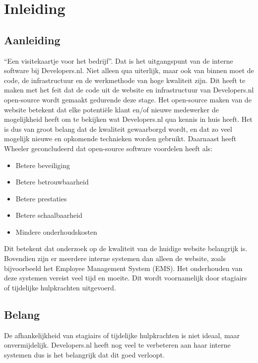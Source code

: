 \chapter{Inleiding}

\label{Chapter1}


\section{Aanleiding}

\enquote{Een visitekaartje voor het bedrijf}. Dat is het uitgangspunt van de interne software bij Developers.nl. Niet alleen qua uiterlijk, maar ook van binnen moet de code, de infrastructuur en de werkmethode van hoge kwaliteit zijn. Dit heeft te maken met het feit dat de code uit de website en infrastructuur van Developers.nl open-source wordt gemaakt gedurende deze stage. Het open-source maken van de website betekent dat elke potentiële klant en/of nieuwe medewerker de mogelijkheid heeft om te bekijken wat Developers.nl qua kennis in huis heeft. Het is dus van groot belang dat de kwaliteit gewaarborgd wordt, en dat zo veel mogelijk nieuwe en opkomende technieken worden gebruikt. Daarnaast heeft Wheeler \parencite{WhyOpenSource} geconcludeerd dat open-source software voordelen heeft als:
\begin{itemize}
	\item Betere beveiliging
	\item Betere betrouwbaarheid 
	\item Betere prestaties
	\item Betere schaalbaarheid
	\item Mindere onderhoudskosten
\end{itemize}

Dit betekent dat onderzoek op de kwaliteit van de huidige website belangrijk is. Bovendien zijn er meerdere interne systemen dan alleen de website, zoals bijvoorbeeld het Employee Management System (EMS). Het onderhouden van deze systemen vereist veel tijd en moeite. Dit wordt voornamelijk door stagiairs of tijdelijke hulpkrachten uitgevoerd.

\section{Belang}

De afhankelijkheid van stagiairs of tijdelijke hulpkrachten is niet ideaal, maar onvermijdelijk. Developers.nl heeft nog veel te verbeteren aan haar interne systemen dus is het belangrijk dat dit goed verloopt.


